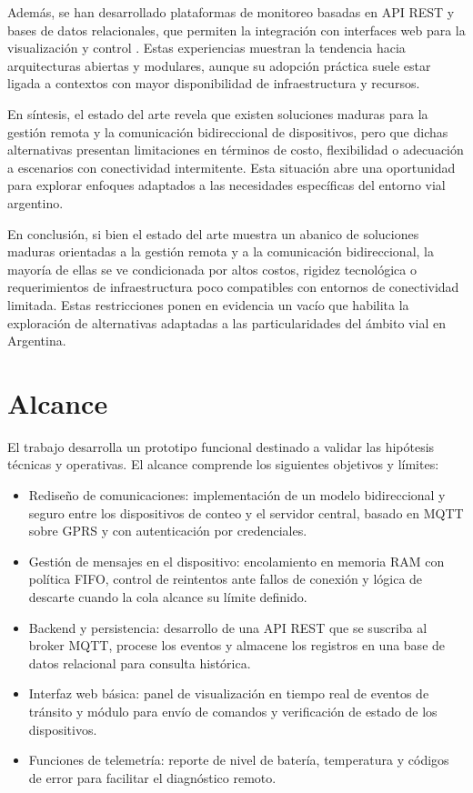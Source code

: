 Además, se han desarrollado plataformas de monitoreo basadas en API REST y bases de datos relacionales, que permiten la integración con interfaces web para la visualización y control \cite{openRemoteSolution}. Estas experiencias muestran la tendencia hacia arquitecturas abiertas y modulares, aunque su adopción práctica suele estar ligada a contextos con mayor disponibilidad de infraestructura y recursos.

En síntesis, el estado del arte revela que existen soluciones maduras para la gestión remota y la comunicación bidireccional de dispositivos, pero que dichas alternativas presentan limitaciones en términos de costo, flexibilidad o adecuación a escenarios con conectividad intermitente. Esta situación abre una oportunidad para explorar enfoques adaptados a las necesidades específicas del entorno vial argentino.

En conclusión, si bien el estado del arte muestra un abanico de soluciones maduras orientadas a la gestión remota y a la comunicación bidireccional, la mayoría de ellas se ve condicionada por altos costos, rigidez tecnológica o requerimientos de infraestructura poco compatibles con entornos de conectividad limitada. Estas restricciones ponen en evidencia un vacío que habilita la exploración de alternativas adaptadas a las particularidades del ámbito vial en Argentina.


\section{Alcance}
El trabajo desarrolla un prototipo funcional destinado a validar las hipótesis técnicas y operativas. El alcance comprende los siguientes objetivos y límites:

\begin{itemize}

\item Rediseño de comunicaciones: implementación de un modelo bidireccional y seguro entre los dispositivos de conteo y el servidor central, basado en MQTT sobre GPRS y con autenticación por credenciales.

\item Gestión de mensajes en el dispositivo: encolamiento en memoria RAM con política FIFO, control de reintentos ante fallos de conexión y lógica de descarte cuando la cola alcance su límite definido.

\item Backend y persistencia: desarrollo de una API REST que se suscriba al broker MQTT, procese los eventos y almacene los registros en una base de datos relacional para consulta histórica.

\item Interfaz web básica: panel de visualización en tiempo real de eventos de tránsito y módulo para envío de comandos y verificación de estado de los dispositivos.

\item Funciones de telemetría: reporte de nivel de batería, temperatura y códigos de error para facilitar el diagnóstico remoto.

\end{itemize}

